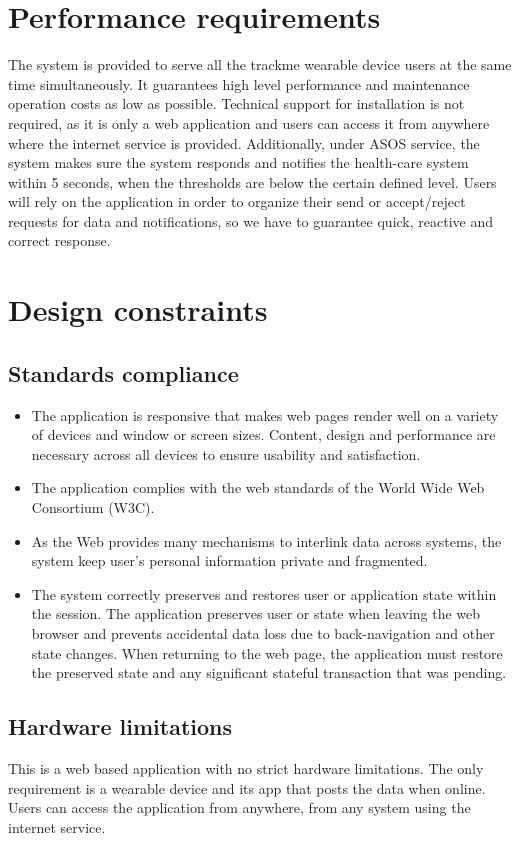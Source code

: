 \documentclass[hidelinks, 12pt]{report}
\begin{document}
	\section{Performance requirements}
	The system is provided to serve all the trackme wearable device users at the same time simultaneously. It guarantees high level performance and maintenance operation costs as low as possible. Technical support for installation is not required, as it is only a web application and users can access it from anywhere where the internet service is provided. Additionally, under ASOS service, the system makes sure the system responds and notifies the health-care system within 5 seconds, when the thresholds are below the certain defined level. Users will rely on the application in order to organize their send or accept/reject requests for data and notifications, so we have to guarantee quick, reactive and correct response.
	\section{Design constraints}
	\subsection{Standards compliance}
	\begin{itemize}
		\item{} The application is responsive that makes web pages render well on a variety of devices and window or screen sizes. Content, design and performance are necessary across all devices to ensure usability and satisfaction.
		\item{} The application complies with the web standards of the World Wide Web Consortium (W3C).
		\item{} As the Web provides many mechanisms to interlink data across systems, the system keep user's personal information private and fragmented.
		\item{} The system correctly preserves and restores user or application state within the session. The application preserves user or state when leaving the web browser and prevents accidental data loss due to back-navigation and other state changes. When returning to the web page, the application must restore the preserved state and any significant stateful transaction that was pending.
		
	\end{itemize}
	
	\subsection{Hardware limitations}
	This is a web based application with no strict hardware limitations. The only requirement is a wearable device and its app that posts the data when online. Users can access the application from anywhere, from any system using the internet service.
\end{document}

